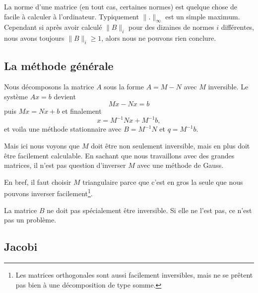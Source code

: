 La norme d'une matrice (en tout cas, certaines normes) est quelque chose de facile à calculer à l'ordinateur. Typiquement \( \| . \|_{\infty}\) est un simple maximum. Cependant si après avoir calculé \( \| B \|_i\) pour des dizaines de normes \( i\) différentes, nous avons toujours \( \| B\|_i\geq 1\), alors nous ne pouvons rien conclure.

\subsection{La méthode générale}

Nous décomposons la matrice \( A\) sous la forme \( A=M-N\) avec \( M\) inversible. Le système \( Ax=b\) devient
\begin{equation}
    Mx-Nx=b
\end{equation}
puis \( Mx=Nx+b\) et finalement 
\begin{equation}
    x=M^{-1}Nx+M^{-1}b,
\end{equation}
et voila une méthode stationnaire avec \( B=M^{-1}N\) et \( q=M^{-1}b\).

Mais ici nous voyons que \( M\) doit être non seulement inversible, mais en plus doit être facilement calculable. En sachant que nous travaillons avec des grandes matrices, il n'est pas question d'inverser \( M\) avec une méthode de Gauss.

En bref, il faut choisir \( M\) triangulaire parce que c'est en gros la seule que nous pouvons inverser facilement\footnote{Les matrices orthogonales sont aussi facilement inversibles, mais ne se prêtent pas bien à une décomposition de type somme.}.

\begin{remark}
    La matrice \( B\) ne doit pas spécialement être inversible. Si elle ne l'est pas, ce n'est pas un problème.
\end{remark}

\subsection{Jacobi}

